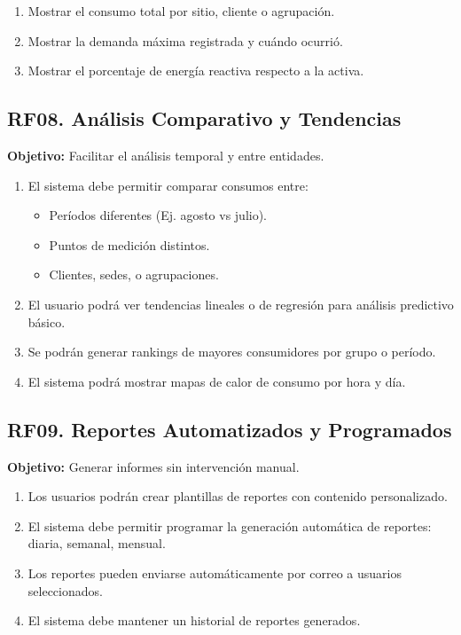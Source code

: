 \documentclass[12pt,a4paper]{article}
\begin{document}
\begin{enumerate}[label=RF07.\arabic*]
    \item Mostrar el consumo total por sitio, cliente o agrupación.
    \item Mostrar la demanda máxima registrada y cuándo ocurrió.
    \item Mostrar el porcentaje de energía reactiva respecto a la activa.
\end{enumerate}

\subsection{RF08. Análisis Comparativo y Tendencias}

\textbf{Objetivo:} Facilitar el análisis temporal y entre entidades.

\begin{enumerate}[label=RF08.\arabic*]
    \item El sistema debe permitir comparar consumos entre:
    \begin{itemize}
        \item Períodos diferentes (Ej. agosto vs julio).
        \item Puntos de medición distintos.
        \item Clientes, sedes, o agrupaciones.
    \end{itemize}
    \item El usuario podrá ver tendencias lineales o de regresión para análisis predictivo básico.
    \item Se podrán generar rankings de mayores consumidores por grupo o período.
    \item El sistema podrá mostrar mapas de calor de consumo por hora y día.
\end{enumerate}

\subsection{RF09. Reportes Automatizados y Programados}

\textbf{Objetivo:} Generar informes sin intervención manual.

\begin{enumerate}[label=RF09.\arabic*]
    \item Los usuarios podrán crear plantillas de reportes con contenido personalizado.
    \item El sistema debe permitir programar la generación automática de reportes: diaria, semanal, mensual.
    \item Los reportes pueden enviarse automáticamente por correo a usuarios seleccionados.
    \item El sistema debe mantener un historial de reportes generados.
\end{enumerate}
\end{document}
